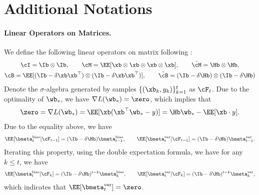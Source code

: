 \documentclass[11pt]{article}
\begin{document}
\appendix
\hypersetup{linkcolor=black ,urlcolor=black}
\onecolumn
\renewcommand{\appendixpagename}{\centering \LARGE Appendix}
\appendixpage

\startcontents[section]
\hypersetup{linkcolor=linkcolor,urlcolor=black}
\vspace{20ex}


\newpage

\section{Additional Notations}


\paragraph{Linear Operators on Matrices.}
We define the following linear operators on matrix following \citet{zou2021benign}:
\begin{gather*}
\cI=\Ib\otimes\Ib,\qquad\cM=\EE[\xb\otimes\xb\otimes\xb\otimes\xb],\qquad\tilde\cM=\Hb\otimes\Hb,\\
\cB=\EE[(\Ib-\delta\xb\xb^\top)\otimes(\Ib-\delta\xb\xb^\top)],\qquad\tilde\cB=(\Ib-\delta\Hb)\otimes(\Ib-\delta\Hb)
\end{gather*}
Denote the $\sigma$-algebra generated by samples $\{(\xb_k, y_k)\}_{k=1}^t$ as $\cF_t$.
Due to the optimality of $\wb_*$, we have $\nabla L(\wb_*)=\zero$, which implies that
\begin{align}\label{eq:noise_zero_mean}
\zero=\nabla L(\wb_*)=\EE[\xb(\xb^\top\wb_*-y)]=\Hb\wb_*-\EE[\xb\cdot y].
\end{align}
Due to the equality above, we have
\begin{align*}
\EE[\bmeta_t^{\mathrm{bias}}|\cF_{t-1}]=(\Ib-\delta\Hb)\bmeta_{t-1}^{\mathrm{bias}},\qquad\EE[\bmeta_t^{\mathrm{var}}|\cF_{t-1}]=(\Ib-\delta\Hb)\bmeta_{t-1}^{\mathrm{var}}.
\end{align*}
Iterating this property, using the double expectation formula, we have for any $k\le t$, we have
\begin{align}\label{eq:iterate_first_moment}
\EE[\bmeta_t^{\mathrm{bias}}|\cF_k]=(\Ib-\delta\Hb)^{t-k}\bmeta_k^{\mathrm{bias}},\qquad\EE[\bmeta_t^{\mathrm{var}}|\cF_k]=(\Ib-\delta\Hb)^{t-k}\bmeta_{k}^{\mathrm{var}},
\end{align}
which indicates that $\EE[\bmeta_t^{\mathrm{var}}]=\zero$.
\end{document}
